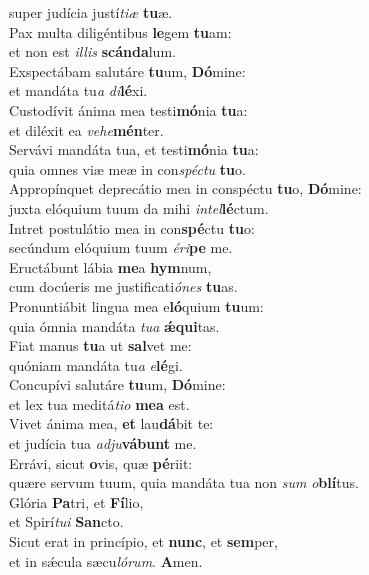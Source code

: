 \evenverse super judícia justí\textit{ti}\textit{æ} \textbf{tu}æ.\\
\oddverse Pax multa diligéntibus \textbf{le}gem \textbf{tu}am:~\*\\
\oddverse et non est \textit{il}\textit{lis} \textbf{scán}\textbf{da}lum.\\
\evenverse Exspectábam salutáre \textbf{tu}um, \textbf{Dó}mine:~\*\\
\evenverse et mandáta tu\textit{a} \textit{di}\textbf{lé}xi.\\
\oddverse Custodívit ánima mea testi\textbf{mó}nia \textbf{tu}a:~\*\\
\oddverse et diléxit ea \textit{ve}\textit{he}\textbf{mén}ter.\\
\evenverse Servávi mandáta tua, et testi\textbf{mó}nia \textbf{tu}a:~\*\\
\evenverse quia omnes viæ meæ in con\textit{spé}\textit{ctu} \textbf{tu}o.\\
\oddverse Appropínquet deprecátio mea in conspéctu \textbf{tu}o, \textbf{Dó}mine:~\*\\
\oddverse juxta elóquium tuum da mihi \textit{in}\textit{tel}\textbf{lé}ctum.\\
\evenverse Intret postulátio mea in con\textbf{spé}ctu \textbf{tu}o:~\*\\
\evenverse secúndum elóquium tuum \textit{é}\textit{ri}\textbf{pe} me.\\
\oddverse Eructábunt lábia \textbf{me}a \textbf{hym}num,~\*\\
\oddverse cum docúeris me justificati\textit{ó}\textit{nes} \textbf{tu}as.\\
\evenverse Pronuntiábit lingua mea e\textbf{ló}quium \textbf{tu}um:~\*\\
\evenverse quia ómnia mandáta \textit{tu}\textit{a} \textbf{ǽ}\textbf{qui}tas.\\
\oddverse Fiat manus \textbf{tu}a ut \textbf{sal}vet me:~\*\\
\oddverse quóniam mandáta tu\textit{a} \textit{e}\textbf{lé}gi.\\
\evenverse Concupívi salutáre \textbf{tu}um, \textbf{Dó}mine:~\*\\
\evenverse et lex tua meditá\textit{ti}\textit{o} \textbf{me}\textbf{a} est.\\
\oddverse Vivet ánima mea, \textbf{et} lau\textbf{dá}bit te:~\*\\
\oddverse et judícia tua \textit{ad}\textit{ju}\textbf{vá}\textbf{bunt} me.\\
\evenverse Errávi, sicut \textbf{o}vis, quæ \textbf{pé}riit:~\*\\
\evenverse quære servum tuum, quia mandáta tua non \textit{sum} \textit{o}\textbf{blí}tus.\\
\oddverse Glória \textbf{Pa}tri, et \textbf{Fí}lio,~\*\\
\oddverse et Spirí\textit{tu}\textit{i} \textbf{San}cto.\\
\evenverse Sicut erat in princípio, et \textbf{nunc}, et \textbf{sem}per,~\*\\
\evenverse et in sǽcula sæcu\textit{ló}\textit{rum}. \textbf{A}men.\\
